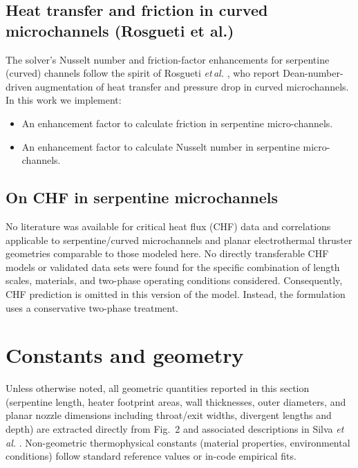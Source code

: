 \documentclass[11pt,a4paper]{article}
\begin{document}
\subsection*{Heat transfer and friction in curved microchannels (Rosgueti et al.)}
The solver’s Nusselt number and friction-factor enhancements for serpentine (curved) channels follow the spirit of Rosgueti \emph{et\,al.} \cite{Rosgueti2022}, who report Dean-number-driven augmentation of heat transfer and pressure drop in curved microchannels. In this work we implement:
\begin{itemize}[nosep]
  \item An enhancement factor to calculate friction in serpentine micro-channels.
  \item An enhancement factor to calculate Nusselt number in serpentine micro-channels.
\end{itemize}

\subsection*{On CHF in serpentine microchannels}
No literature was available for critical heat flux (CHF) data and correlations applicable to serpentine/curved microchannels and planar electrothermal thruster geometries comparable to those modeled here. No directly transferable CHF models or validated data sets were found for the specific combination of length scales, materials, and two-phase operating conditions considered. Consequently, CHF prediction is omitted in this version of the model. Instead, the formulation uses a conservative two-phase treatment.

\section{Constants and geometry}
\begin{tcolorbox}[colback=blue!2!white,colframe=blue!40!black,title=Provenance of values,left=1mm,right=1mm,top=0.6mm,bottom=0.6mm]
Unless otherwise noted, all geometric quantities reported in this section (serpentine length, heater footprint areas, wall thicknesses, outer diameters, and planar nozzle dimensions including throat/exit widths, divergent lengths and depth) are extracted directly from Fig.~2 and associated descriptions in Silva \emph{et\,al.} \cite{Silva2023}. Non-geometric thermophysical constants (material properties, environmental conditions) follow standard reference values or in-code empirical fits.
\end{tcolorbox}
\end{document}
